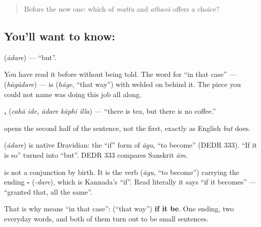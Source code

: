 \label{lesson:KA-C67-but}



\begin{quote}
Before the new one: which of \emph{mattu} and \emph{athavā} offers a choice?
\end{quote}

\subsection*{You'll want to know: }
\textbf{} (\emph{ādare}) — \textquotedblleft{}but\textquotedblright{}.

You have read it before without being told. The word for \textquotedblleft{}in that case\textquotedblright{} — \textbf{} (\emph{hāgādare}) — is  (\emph{hāge}, \textquotedblleft{}that way\textquotedblright{}) with  welded on behind it. The piece you could not name was doing this job all along.

\textbf{ ,   } (\emph{cahā ide, ādare kāphi illa}) — \textquotedblleft{}there is tea, but there is no coffee.\textquotedblright{}

 opens the second half of the sentence, not the first, exactly as English \emph{but} does.

\begin{cousinweb}
\textbf{} (\emph{ādare}) is native Dravidian: the \textquotedblleft{}if\textquotedblright{} form of \emph{āgu}, \textquotedblleft{}to become\textquotedblright{} (DEDR 333). \textquotedblleft{}If it is so\textquotedblright{} turned into \textquotedblleft{}but\textquotedblright{}. DEDR 333 compares Sanskrit \emph{ām}.
\end{cousinweb}

\begin{grammarlens}[title={Grammar Lens: a verb doing a conjunction's job}]
 is not a conjunction by birth. It is the verb  (\emph{āgu}, \textquotedblleft{}to become\textquotedblright{}) carrying the ending \textbf{-} (\emph{-dare}), which is Kannada's \textquotedblleft{}if\textquotedblright{}. Read literally it says \textquotedblleft{}if it becomes\textquotedblright{} — \textquotedblleft{}granted that, all the same\textquotedblright{}.

That is why  means \textquotedblleft{}in that case\textquotedblright{}:  (\textquotedblleft{}that way\textquotedblright{}) \textbf{if it be}. One ending, two everyday words, and both of them turn out to be small sentences.
\end{grammarlens}

